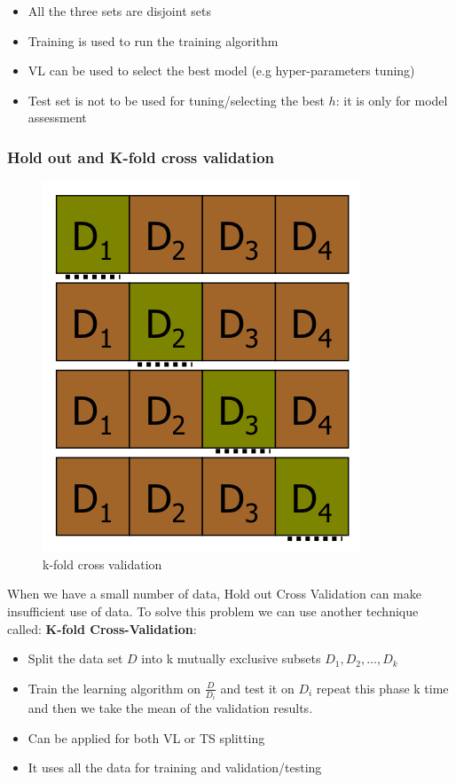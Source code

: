 \documentclass[../main.tex]{subfiles}
\begin{document}
\begin{itemize}
    \item All the three sets are disjoint sets
    \item Training is used to run the training algorithm
    \item VL can be used to select the best model (e.g hyper-parameters tuning)
    \item Test set is not to be used for tuning/selecting the best $h$: it is only for model assessment
\end{itemize}

\subsubsection{Hold out and K-fold cross validation}
\begin{figure}
    \centering
    \includegraphics[scale = 0.3]{lectures/1_Introduction/1_kfold.png}
    \caption{k-fold cross validation}
    \label{fig:1_kfold}
\end{figure}
When we have a small number of data, Hold out Cross Validation can make insufficient use of data. To solve this problem we can use another technique called: \textbf{K-fold Cross-Validation}:

\begin{itemize}
    \item Split the data set $D$ into k mutually exclusive subsets $D_1,D_2,\dots,D_k$
    \item Train the learning algorithm on $\frac{D}{D_{i}}$ and test it on $D_i$ repeat this phase k time and then we take the mean of the validation results.
    \item Can be applied for both VL or TS splitting
    \item It uses all the data for training and validation/testing
\end{itemize}
\end{document}
